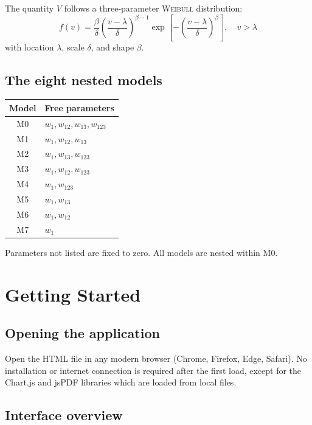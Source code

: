 \documentclass[11pt,a4paper]{article}
\newcommand{\Weibull}{\textsc{Weibull}}
\begin{document}
The quantity $V$ follows a three-parameter \Weibull{} distribution:
\begin{equation}
  f(v) = \frac{\beta}{\delta}\left(\frac{v-\lambda}{\delta}\right)^{\beta-1}
         \exp\!\left[-\left(\frac{v-\lambda}{\delta}\right)^{\beta}\right], \quad v > \lambda
\end{equation}
with location $\lambda$, scale $\delta$, and shape $\beta$.

\subsection{The eight nested models}

\begin{center}
\begin{tabular}{cl}
\toprule
\textbf{Model} & \textbf{Free parameters} \\
\midrule
M0 & $w_1, w_{12}, w_{13}, w_{123}$ \\
M1 & $w_1, w_{12}, w_{13}$ \\
M2 & $w_1, w_{13}, w_{123}$ \\
M3 & $w_1, w_{12}, w_{123}$ \\
M4 & $w_1, w_{123}$ \\
M5 & $w_1, w_{13}$ \\
M6 & $w_1, w_{12}$ \\
M7 & $w_1$ \\
\bottomrule
\end{tabular}
\end{center}

Parameters not listed are fixed to zero. All models are nested within M0.

\section{Getting Started}

\subsection{Opening the application}

Open the HTML file in any modern browser (Chrome, Firefox, Edge, Safari). No installation or internet connection is required after the first load, except for the Chart.js and jsPDF libraries which are loaded from local files.

\subsection{Interface overview}
\end{document}
